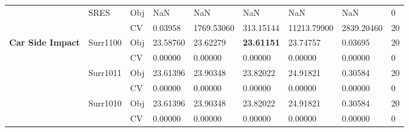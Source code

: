 \begin{table*}[!htb]
\begin{tabular}{lllllllll}
		& \multirow{2}{*}{SRES}              & Obj                                & NaN                                & NaN                                & NaN                                  & NaN                                 & NaN                               & 0                \\
		&                                    & CV                                 & 0.03958                            & 1769.53060                         & 313.15144                            & 11213.79900                         & 2839.20460                        & 20               \\ \hline
		\multirow{16}{*}{\textbf{Car Side Impact}}   & Surr1100                           & Obj                                & 23.58760                           & 23.62279                           & \textbf{23.61151}                    & 23.74757                            & 0.03695                           & 20               \\
		&                                    & CV                                 & 0.00000                            & 0.00000                            & 0.00000                              & 0.00000                             & 0.00000                           & 0                \\
		& Surr1011                           & Obj                                & 23.61396                           & 23.90348                           & 23.82022                             & 24.91821                            & 0.30584                           & 20               \\
		&                                    & CV                                 & 0.00000                            & 0.00000                            & 0.00000                              & 0.00000                             & 0.00000                           & 0                \\
		& Surr1010                           & Obj                                & 23.61396                           & 23.90348                           & 23.82022                             & 24.91821                            & 0.30584                           & 20               \\
		&                                    & CV                                 & 0.00000                            & 0.00000                            & 0.00000                              & 0.00000                             & 0.00000                           & 0                \\

\end{tabular}
\end{table*}
